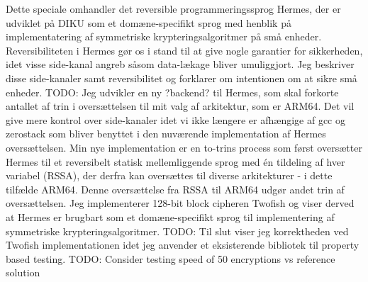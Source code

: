 Dette speciale omhandler det reversible programmeringssprog Hermes, der er udviklet på DIKU som et domæne-specifikt sprog med henblik på implementatering af symmetriske krypteringsalgoritmer på små enheder.
Reversibiliteten i Hermes gør os i stand til at give nogle garantier for sikkerheden, idet visse side-kanal angreb såsom data-lækage bliver umuliggjort. Jeg beskriver disse side-kanaler samt reversibilitet og forklarer om intentionen om at sikre små enheder.
TODO: Jeg udvikler en ny ?backend? til Hermes, som skal forkorte antallet af trin i oversættelsen til mit valg af arkitektur, som er ARM64. Det vil give mere kontrol over side-kanaler idet vi ikke længere er afhængige af gcc og zerostack som bliver benyttet i den nuværende implementation af Hermes oversættelsen.
Min nye implementation er en to-trins process som først oversætter Hermes til et reversibelt statisk mellemliggende sprog med én tildeling af hver variabel (RSSA), der derfra kan oversættes til diverse arkitekturer - i dette tilfælde ARM64. Denne oversættelse fra RSSA til ARM64 udgør andet trin af oversættelsen.
Jeg implementerer 128-bit block cipheren Twofish og viser derved at Hermes er brugbart som et domæne-specifikt sprog til implementering af symmetriske krypteringsalgoritmer.
TODO: Til slut viser jeg korrektheden ved Twofish implementationen idet jeg anvender et eksisterende bibliotek til property based testing. 
TODO: Consider testing speed of 50 encryptions vs reference solution

